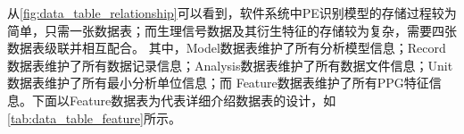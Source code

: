 从\autoref{fig:data_table_relationship}可以看到，软件系统中PE识别模型的存储过程较为简单，只需一张数据表；而生理信号数据及其衍生特征的存储较为复杂，需要四张数据表级联并相互配合。
其中，Model数据表维护了所有分析模型信息；Record数据表维护了所有数据记录信息；Analysis数据表维护了所有数据文件信息；Unit数据表维护了所有最小分析单位信息；而
Feature数据表维护了所有PPG特征信息。下面以Feature数据表为代表详细介绍数据表的设计，如\autoref{tab:data_table_feature}所示。



